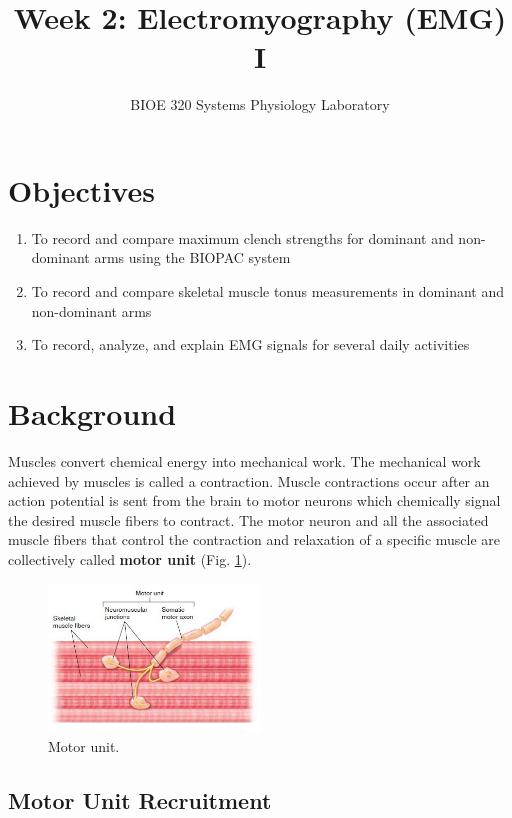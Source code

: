 \documentclass{article}
\title{Week 2: Electromyography (EMG) I}
\author{BIOE 320 Systems Physiology Laboratory}
\date{}
\begin{document}
\large
\maketitle

\section*{Objectives}
\begin{enumerate}
	\item To record and compare maximum clench strengths for dominant and non-dominant arms using the BIOPAC system
	\item To record and compare skeletal muscle tonus measurements in dominant and non-dominant arms
	\item To record, analyze, and explain EMG signals for several daily activities
\end{enumerate}

\section*{Background}
Muscles convert chemical energy into mechanical work. The mechanical work
achieved by muscles is called a contraction. Muscle contractions occur after an action potential is sent from the brain to motor neurons which chemically signal the desired muscle fibers to contract. The motor neuron and all the associated muscle fibers that control the contraction and relaxation of a specific muscle are collectively called \textbf{motor unit} (Fig. \ref{motor_unit}).

\begin{figure}[h]
\includegraphics[width=0.5\textwidth]{../images/EMG_I_1.jpg}
\centering
\caption{Motor unit.}
\label{motor_unit}
\end{figure}

\subsection*{Motor Unit Recruitment}
\end{document}
